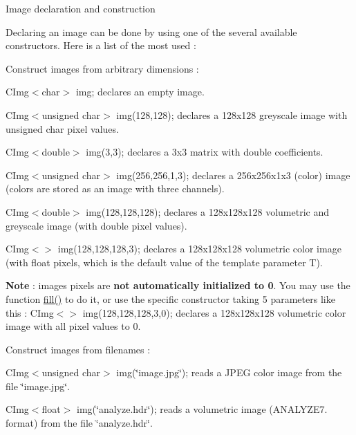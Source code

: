\begin{DoxyParagraph}{Image declaration and construction}

\end{DoxyParagraph}
Declaring an image can be done by using one of the several available constructors. Here is a list of the most used \-:


\begin{DoxyItemize}
\item Construct images from arbitrary dimensions \-:
\begin{DoxyItemize}
\item {\ttfamily C\-Img$<$char$>$ img;} declares an empty image.
\item {\ttfamily C\-Img$<$unsigned char$>$ img(128,128);} declares a 128x128 greyscale image with {\ttfamily unsigned} {\ttfamily char} pixel values.
\item {\ttfamily C\-Img$<$double$>$ img(3,3);} declares a 3x3 matrix with {\ttfamily double} coefficients.
\item {\ttfamily C\-Img$<$unsigned char$>$ img(256,256,1,3);} declares a 256x256x1x3 (color) image (colors are stored as an image with three channels).
\item {\ttfamily C\-Img$<$double$>$ img(128,128,128);} declares a 128x128x128 volumetric and greyscale image (with {\ttfamily double} pixel values).
\item {\ttfamily C\-Img$<$$>$ img(128,128,128,3);} declares a 128x128x128 volumetric color image (with {\ttfamily float} pixels, which is the default value of the template parameter {\ttfamily T}).
\item {\bfseries Note} \-: images pixels are {\bfseries not automatically initialized to 0}. You may use the function \hyperlink{structcimg__library_1_1_c_img_a22c7685eaf6d61e3e25186f702cc89d0}{fill()} to do it, or use the specific constructor taking 5 parameters like this \-: {\ttfamily C\-Img$<$$>$ img(128,128,128,3,0);} declares a 128x128x128 volumetric color image with all pixel values to 0.
\end{DoxyItemize}
\item Construct images from filenames \-:
\begin{DoxyItemize}
\item {\ttfamily C\-Img$<$unsigned char$>$ img(\char`\"{}image.\-jpg\char`\"{});} reads a J\-P\-E\-G color image from the file \char`\"{}image.\-jpg\char`\"{}.
\item {\ttfamily C\-Img$<$float$>$ img(\char`\"{}analyze.\-hdr\char`\"{});} reads a volumetric image (A\-N\-A\-L\-Y\-Z\-E7. format) from the file \char`\"{}analyze.\-hdr\char`\"{}.

\end{DoxyItemize}
\end{DoxyItemize}
